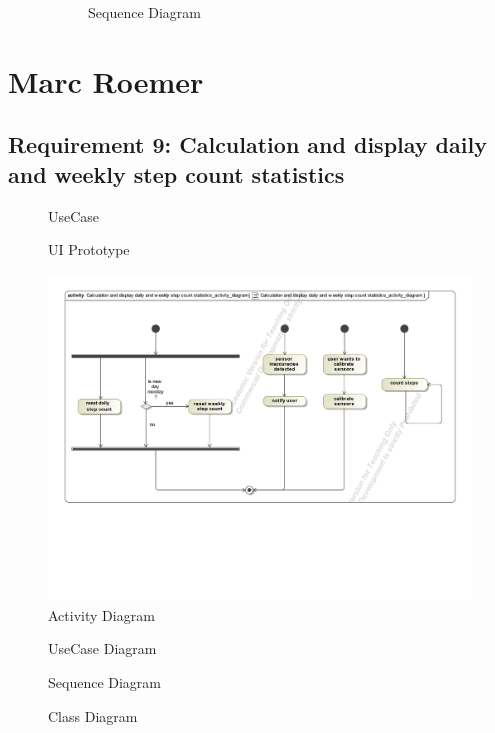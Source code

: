 \documentclass{article}
\begin{document}
	\begin{figure}[htbp]
		\centering
		\begin{subfigure}{\textwidth}
			\centering
			\scalebox{0.55}{}
			\caption{Sequence Diagram}
		\end{subfigure}
		\begin{subfigure}{\textwidth}
		
		\end{subfigure}
	\end{figure}
\clearpage


\section{Marc Roemer}
	\subsection{Requirement 9: Calculation and display daily and weekly step count statistics}
		\begin{figure}[h!]
			\centering
			\captionsetup{labelformat=empty}
			\caption{UseCase}
		\end{figure}
		\newpage
		\begin{figure}[h!]
			\centering
			\captionsetup{labelformat=empty}
			\caption{UI Prototype}
		\end{figure}
		\newpage
		\begin{figure}[h!]
		    \centering
		    \captionsetup{labelformat=empty}
		    \caption{Activity Diagram}
		    \includegraphics[width=\textwidth, angle=0]{Marc/req9/9activity.pdf}
		\end{figure}
		\newpage
		\begin{figure}[h!]
			\centering
			\captionsetup{labelformat=empty}
			\caption{UseCase Diagram}
		\end{figure}
		\newpage
		\begin{figure}[h!]
			\centering
			\captionsetup{labelformat=empty}
			\caption{Sequence Diagram}
		\end{figure}
		\newpage
		\begin{figure}[h!]
			\centering
			\captionsetup{labelformat=empty}
			\caption{Class Diagram}
		\end{figure}
		\newpage
\end{document}
